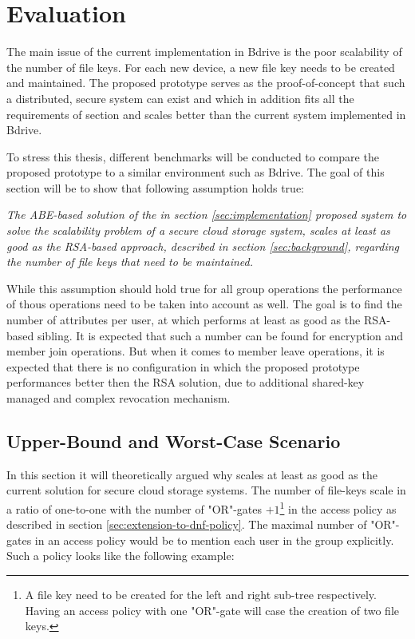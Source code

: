 \chapter{Evaluation}
\label{sec:evaluation}

The main issue of the current implementation in Bdrive is the poor scalability of the number of file keys. For each new device, a new file key needs to be created and maintained. The proposed prototype serves as the proof-of-concept that such a distributed, secure system can exist and which in addition fits all the requirements of section  and scales better than the current system implemented in Bdrive. 

To stress this thesis, different benchmarks will be conducted to compare the proposed prototype to a similar environment such as Bdrive. The goal of this section will be to show that following assumption holds true:

\begin{center}
\textit{The ABE-based solution of the in section \ref{sec:implementation} proposed system to solve the scalability problem of a secure cloud storage system, scales at least as good as the RSA-based approach, described in section \ref{sec:background}, regarding the number of file keys that need to be maintained.}
\end{center}

While this assumption should hold true for all group operations the performance of thous operations need to be taken into account as well. The goal is to find the number of attributes per user, at which \name performs at least as good as the RSA-based sibling. It is expected that such a number can be found for encryption and member join operations. But when it comes to member leave operations, it is expected that there is no configuration in which the proposed prototype performances better then the RSA solution, due to additional shared-key managed and complex revocation mechanism. 

\section{Upper-Bound and Worst-Case Scenario}
\label{sec:upper-bound-and-worst-case-scenario}
In this section it will theoretically argued why \name scales at least as good as the current solution for secure cloud storage systems. The number of file-keys scale in a ratio of one-to-one with the number of "OR"-gates $+ 1$\footnote{A file key need to be created for the left and right sub-tree respectively. Having an access policy with one "OR"-gate will case the creation of two file keys.} in the access policy as described in section  \ref{sec:extension-to-dnf-policy}. The maximal number of "OR"-gates in an access policy would be to mention each user in the group explicitly. Such a policy looks like the following example:

